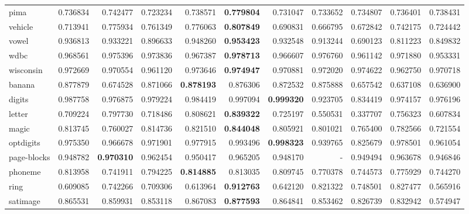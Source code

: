 \begin{tabular}{lrrrrrrrrrr}
pima            &   0.736834 &  0.742477 &  0.723234 &  0.738571 & \textbf{0.779804} &  0.731047 &  0.733652 &  0.734807 &  0.736401 &  0.738431 \\
vehicle         &   0.713941 &  0.775934 &  0.761349 &  0.776063 &  \textbf{0.807849} &  0.690831 &  0.666795 &  0.672842 &  0.742175 &  0.724442 \\
vowel           &   0.936813 &  0.933221 &  0.896633 &  0.948260 &  \textbf{0.953423} &  0.932548 &  0.913244 &  0.690123 &  0.811223 &  0.849832 \\
wdbc            &   0.968561 &  0.975396 &  0.973836 &  0.967387 &  \textbf{0.978713} &  0.966607 &  0.976760 &  0.961142 &  0.971880 &  0.953331 \\
wisconsin       &   0.972669 &  0.970554 &  0.961120 &  0.973646 &  \textbf{0.974947} &  0.970881 &  0.972020 &  0.974622 &  0.962750 &  0.970718 \\
banana          &   0.877879 &  0.674528 &  0.871066 &  \textbf{0.878193} &  0.876306 &  0.872532 &  0.875888 &  0.657542 &  0.637108 &  0.636900 \\
digits          &   0.987758 &  0.976875 &  0.979224 &  0.984419 &  0.997094 &  \textbf{0.999320} &  0.923705 &  0.834419 &  0.974157 &  0.976196 \\
letter          &   0.709224 &  0.797730 &  0.718486 &  0.808621 &  \textbf{0.839322} &  0.725197 &  0.550531 &  0.337707 &  0.756323 &  0.607834 \\
magic           &   0.813745 &  0.760027 &  0.814736 &  0.821510 &  \textbf{0.844048} &  0.805921 &  0.801021 &  0.765400 &  0.782566 &  0.721554 \\
optdigits       &   0.975350 &  0.966678 &  0.971901 &  0.977915 &  0.993496 &  \textbf{0.998323} &  0.939765 &  0.825679 &  0.978501 &  0.961054 \\
page-blocks     &   0.948782 &  \textbf{0.970310} &  0.962454 &  0.950417 &  0.965205 &  0.948170 &       - &  0.949494 &  0.963678 &  0.946846 \\
phoneme         &   0.813958 &  0.741911 &  0.794225 &  \textbf{0.814885} &  0.813035 &  0.809745 &  0.770378 &  0.744573 &  0.775929 &  0.744270 \\
ring            &   0.609085 &  0.742266 &  0.709306 &  0.613964 &  \textbf{0.912763} &  0.642120 &  0.821322 &  0.748501 &  0.827477 &  0.565916 \\
satimage        &   0.865531 &  0.859931 &  0.853118 &  0.867083 &  \textbf{0.877593} &  0.864841 &  0.853462 &  0.826739 &  0.832942 &  0.574947 \\

\end{tabular}
